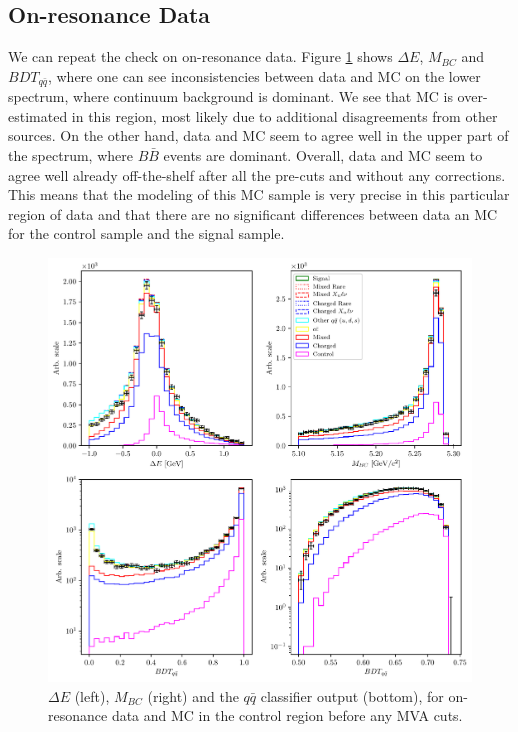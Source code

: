 \subsection{On-resonance Data}

We can repeat the check on on-resonance data. Figure \ref{fig:onres_control} shows $\Delta E$, $M_{BC}$ and $BDT_{q \bar q}$, where one can see inconsistencies between data and MC on the lower spectrum, where continuum background is dominant. We see that MC is over-estimated in this region, most likely due to additional disagreements from other sources. On the other hand, data and MC seem to agree well in the upper part of the spectrum, where $B \bar B$ events are dominant. Overall, data and MC seem to agree well already off-the-shelf after all the pre-cuts and without any corrections. This means that the modeling of this MC sample is very precise in this particular region of data and that there are no significant differences between data an MC for the control sample and the signal sample.
\begin{figure}[H]
	\centering
	\captionsetup{width=0.8\linewidth}
	\includegraphics[width=\linewidth]{fig/onres_control}
	\caption{$\Delta E$ (left), $M_{BC}$ (right) and the $q \bar q$ classifier output (bottom), for on-resonance data and MC in the control region before any MVA cuts.}
	\label{fig:onres_control}
\end{figure}